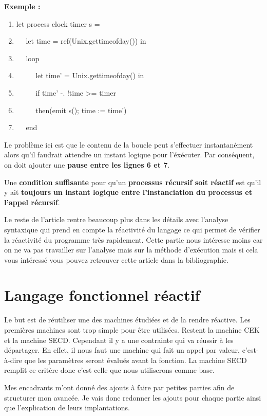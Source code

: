 \documentclass[10pt,a4paper]{report}
\begin{document}
\textbf{Exemple :}
\smallbreak
\begin{enumerate}
\item let process clock timer s =
\item $\quad$ let time = ref(Unix.gettimeofday()) in
\item $\quad$ loop
\item $\quad$ $\quad$ let time' = Unix.gettimeofday() in
\item $\quad$ $\quad$ if time' -. !time >= timer
\item $\quad$ $\quad$ then(emit s(); time := time')
\item $\quad$ end 
\end{enumerate}
\medbreak

Le probl\`{e}me ici est que le contenu de la boucle peut s'effectuer instantan\'{e}ment alors qu'il faudrait attendre un instant logique pour l'éxécuter. Par conséquent, on doit ajouter une \textbf{pause entre les lignes 6 et 7}.
\bigbreak

Une \textbf{condition suffisante} pour qu'un \textbf{processus r\'{e}cursif soit r\'{e}actif} est qu'il y ait \textbf{toujours} \textbf{un instant logique entre l'instanciation du processus et l'appel r\'{e}cursif}.
\bigbreak


Le reste de l'article rentre beaucoup plus dans les détails avec l'analyse syntaxique qui prend en compte la réactivité du langage ce qui permet de vérifier la réactivité du programme très rapidement. Cette partie nous intéresse moins car on ne va pas travailler sur l'analyse mais sur la méthode d'exécution mais si cela vous intéressé vous pouvez retrouver cette article dans la bibliographie.



\chapter{Langage fonctionnel réactif}\label{SECDConc4}

Le but est de réutiliser une des machines étudiées et de la rendre réactive. Les premières machines sont trop simple pour être utilisées. Restent la machine CEK et la machine SECD. Cependant il y a une contrainte qui va réussir à les départager. En effet, il nous faut une machine qui fait un appel par valeur, c'est-à-dire que les paramètres seront évalués avant la fonction. La machine SECD remplit ce critère donc c'est celle que nous utiliserons comme base.
\medbreak

Mes encadrants m'ont donné des ajouts à faire par petites parties afin de structurer mon avancée. Je vais donc redonner les ajouts pour chaque partie ainsi que l'explication de leurs implantations.
\bigbreak
\end{document}

